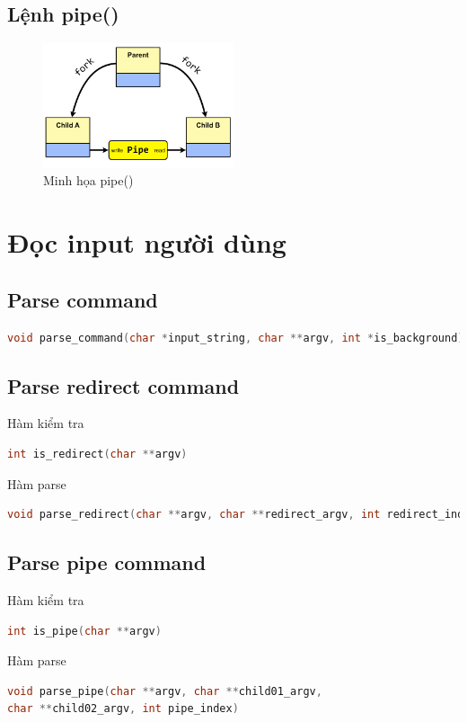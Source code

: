 \documentclass{article}
\begin{document}
\subsection{Lệnh pipe()}
\begin{figure}[H]
\centering
\includegraphics[width=0.5\textwidth]{pipe_1.png}
\caption{Minh họa pipe()}
\end{figure}



\section{Đọc input người dùng}

\subsection{Parse command}
\begin{lstlisting}[language=C]
void parse_command(char *input_string, char **argv, int *is_background) 
\end{lstlisting}

\subsection{Parse redirect command}
Hàm kiểm tra
\begin{lstlisting}[language=C]
int is_redirect(char **argv) 
\end{lstlisting}
Hàm parse
\begin{lstlisting}[language=C]
void parse_redirect(char **argv, char **redirect_argv, int redirect_index)
\end{lstlisting}

\subsection{Parse pipe command}
Hàm kiểm tra
\begin{lstlisting}[language=C]
int is_pipe(char **argv)
\end{lstlisting}
Hàm parse
\begin{lstlisting}[language=C]
void parse_pipe(char **argv, char **child01_argv, 
char **child02_argv, int pipe_index)
\end{lstlisting}
\end{document}
